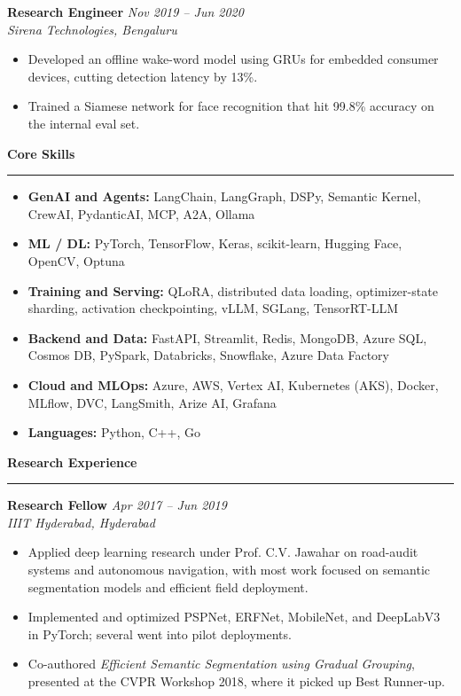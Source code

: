 \documentclass[a4paper,10pt]{article}
\newcommand{\resumesection}[1]{
    \needspace{4\baselineskip}%
    \vspace{0.22cm}
    {\large\textbf{#1}}
    \vspace{0.06cm}
    \hrule
    \vspace{0.08cm}%
    \nopagebreak
}
\newcommand{\roleheader}[4]{
    \needspace{5\baselineskip}%
    \textbf{#1} \hfill \textit{#4} \\
    \textit{#2, #3}%
    \nopagebreak
}
\begin{document}
\vspace{0.08cm}

\roleheader{Research Engineer}{Sirena Technologies}{Bengaluru}{Nov 2019 -- Jun 2020}
\begin{itemize}[leftmargin=*, itemsep=3pt, topsep=4pt]
    \item Developed an offline wake-word model using GRUs for embedded consumer devices, cutting detection latency by 13\%.
    \item Trained a Siamese network for face recognition that hit 99.8\% accuracy on the internal eval set.
\end{itemize}

\resumesection{Core Skills}
\begin{itemize}[leftmargin=*, itemsep=2pt, topsep=4pt]
    \item \textbf{GenAI and Agents:} LangChain, LangGraph, DSPy, Semantic Kernel, CrewAI, PydanticAI, MCP, A2A, Ollama
    \item \textbf{ML / DL:} PyTorch, TensorFlow, Keras, scikit-learn, Hugging Face, OpenCV, Optuna
    \item \textbf{Training and Serving:} QLoRA, distributed data loading, optimizer-state sharding, activation checkpointing, vLLM, SGLang, TensorRT-LLM
    \item \textbf{Backend and Data:} FastAPI, Streamlit, Redis, MongoDB, Azure SQL, Cosmos DB, PySpark, Databricks, Snowflake, Azure Data Factory
    \item \textbf{Cloud and MLOps:} Azure, AWS, Vertex AI, Kubernetes (AKS), Docker, MLflow, DVC, LangSmith, Arize AI, Grafana
    \item \textbf{Languages:} Python, C++, Go
\end{itemize}

\resumesection{Research Experience}

\roleheader{Research Fellow}{IIIT Hyderabad}{Hyderabad}{Apr 2017 -- Jun 2019}
\begin{itemize}[leftmargin=*, itemsep=3pt, topsep=4pt]
    \item Applied deep learning research under Prof. C.V. Jawahar on road-audit systems and autonomous navigation, with most work focused on semantic segmentation models and efficient field deployment.
    \item Implemented and optimized PSPNet, ERFNet, MobileNet, and DeepLabV3 in PyTorch; several went into pilot deployments.
    \item Co-authored \textit{Efficient Semantic Segmentation using Gradual Grouping}, presented at the CVPR Workshop 2018, where it picked up Best Runner-up.
\end{itemize}
\end{document}
